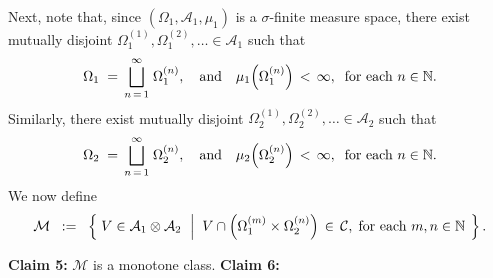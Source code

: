\vskip 0.5cm
\noindent
Next, note that, since $\left(\Omega_{1},\mathcal{A}_{1},\mu_{1}\right)$
is a $\sigma$-finite measure space, there exist mutually disjoint
$\Omega_{1}^{(1)}, \Omega_{1}^{(2)}, \ldots \in \mathcal{A}_{1}$ such that
\begin{equation*}
\Omega_{1} \; = \, \overset{\infty}{\underset{n\,=\,1}{\bigsqcup}}\;\Omega_{1}^{(n)},
\quad\textnormal{and}\quad
\mu_{1}\!\left(\Omega_{1}^{(n)}\right) \,<\, \infty,
\;\;\textnormal{for each $n\in\mathbb{N}$}.
\end{equation*}
Similarly, there exist mutually disjoint 
$\Omega_{2}^{(1)}, \Omega_{2}^{(2)}, \ldots \in \mathcal{A}_{2}$ such that
\begin{equation*}
\Omega_{2} \; = \, \overset{\infty}{\underset{n\,=\,1}{\bigsqcup}}\;\Omega_{2}^{(n)},
\quad\textnormal{and}\quad
\mu_{2}\!\left(\Omega_{2}^{(n)}\right) \,<\, \infty,
\;\;\textnormal{for each $n\in\mathbb{N}$}.
\end{equation*}
We now define
\begin{equation*}
\mathcal{M}
\;\; := \;\;
	\left\{\;
	V \in \mathcal{A}_{1}\otimes\mathcal{A}_{2}
	\;\,\left\vert\;\;
		V\cap\left(\Omega_{1}^{(m)}\times\Omega_{2}^{(n)}\right)
		\,\in\, \mathcal{C},
		\;\textnormal{for each $m, n \in \mathbb{N}$}
	\right.
	\;\right\}.
\end{equation*}
\vskip 0.5cm
\begin{center}
\begin{minipage}{6.5in}
\noindent
\textbf{Claim 5:}\quad
$\mathcal{M}$ is a monotone class.
\vskip 0.5cm
\noindent
\textbf{Claim 6:}\quad
\end{minipage}
\end{center}

